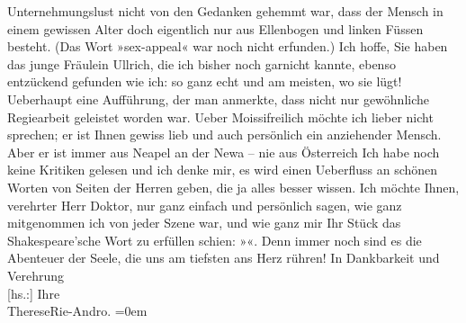 \begin{ledgroupsized}[t]{13cm}
               Unternehmungslust nicht von den Gedanken gehemmt war, dass der Mensch in einem
               gewissen Alter doch eigentlich nur aus Ellenbogen und linken Füssen besteht. (Das
               Wort »sex-appeal« war noch nicht erfunden.) Ich hoffe, Sie haben das junge Fräulein
                  Ullrich, die ich bisher noch garnicht kannte,
               ebenso entzückend gefunden wie ich: so ganz echt und am meisten, wo sie lügt!\pend
           \pstart
           Ueberhaupt eine Aufführung, der man anmerkte, dass nicht nur gewöhnliche Regiearbeit
               geleistet worden war. Ueber Moissifreilich möchte ich lieber nicht
               sprechen; er ist Ihnen gewiss lieb und auch persönlich ein anziehender Mensch. Aber
               er ist immer aus Neapel an der Newa – nie aus Österreich\pend
           \pstart
           Ich habe noch keine Kritiken gelesen und ich denke mir, es wird einen Ueberfluss an
               schönen Worten von Seiten der Herren geben, die ja alles besser wissen. Ich möchte
               Ihnen, verehrter Herr Doktor, nur ganz einfach und persönlich sagen, wie ganz
               mitgenommen ich von jeder Szene war, und wie ganz mir Ihr Stück das Shakespeare’sche Wort zu erfüllen schien: »\label{K_L02567-2v}\label{K_L02567-2h}«. Denn immer
               noch sind es die Abenteuer der Seele, die uns am tiefsten ans Herz rühren!\pend
           \pstart
           In Dankbarkeit und Verehrung{\\[\baselineskip]}{[}hs.:{]} Ihre{\\[\baselineskip]}\spacefill\mbox{ThereseRie-Andro.}\pend
           \leftskip=0em{}
         
         \endnumbering{}\end{ledgroupsized}  \newcommand{\dateiname}{L02567}\newcommand{\titel}{Therese Rie-Andro an Arthur Schnitzler, 22. 12. 1929}\newcommand{\editorInnen}{Martin Anton Müller und Gerd-Hermann Susen}
      
